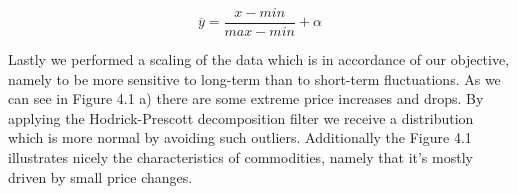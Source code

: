 \begin{equation} \label{eq:solve}
\overline{ y } = \frac{x - min}{max - min}  + \alpha \end{equation}


Lastly we performed a scaling of the data which is in accordance of our objective, namely to be more sensitive to long-term than to short-term fluctuations. As we can see in Figure 4.1 a) there are some extreme price increases and drops. By applying the Hodrick-Prescott decomposition \cite{edward81} filter we receive a distribution which is more normal by avoiding such outliers. Additionally the Figure 4.1 illustrates nicely the characteristics of commodities, namely that it's mostly driven by small price changes. 






